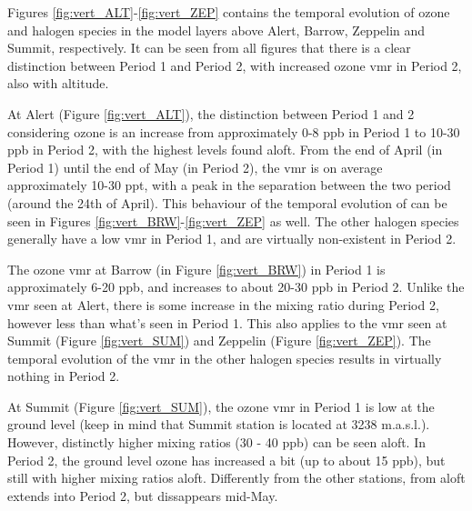 %


\medskip

Figures \ref{fig:vert_ALT}-\ref{fig:vert_ZEP} contains the temporal evolution of ozone and halogen species in the model layers above Alert, Barrow, Zeppelin and Summit, respectively. It can be seen from all figures that there is a clear distinction between Period 1 and Period 2, with increased ozone \acrshort{vmr} in Period 2, also with altitude. 

\medskip

At Alert (Figure \ref{fig:vert_ALT}), the distinction between Period 1 and 2 considering ozone is an increase from approximately 0-8 ppb in Period 1 to 10-30 ppb in Period 2, with the highest levels found aloft. From the end of April (in Period 1) until the end of May (in Period 2), the  \acrshort{vmr} is on average approximately 10-30 ppt, with a peak in the separation between the two period (around the 24th of April). This behaviour of the temporal evolution of  can be seen in Figures \ref{fig:vert_BRW}-\ref{fig:vert_ZEP} as well. The other halogen species generally have a low \acrshort{vmr} in Period 1, and are virtually non-existent in Period 2. 

\medskip

The ozone \acrshort{vmr} at Barrow (in Figure \ref{fig:vert_BRW}) in Period 1 is approximately 6-20 ppb, and increases to about 20-30 ppb in Period 2. Unlike the  \acrshort{vmr} seen at Alert, there is some increase in the mixing ratio during Period 2, however less than what's seen in Period 1. This also applies to the  \acrshort{vmr} seen at Summit (Figure \ref{fig:vert_SUM}) and Zeppelin (Figure \ref{fig:vert_ZEP}). The temporal evolution of the \acrshort{vmr} in the other halogen species results in virtually nothing in Period 2.

\medskip

At Summit (Figure \ref{fig:vert_SUM}), the ozone \acrshort{vmr} in Period 1 is low at the ground level (keep in mind that Summit station is located at 3238 m.a.s.l.). However, distinctly higher mixing ratios (30 - 40 ppb) can be seen aloft. In Period 2, the ground level ozone has increased a bit (up to about 15 ppb), but still with higher mixing ratios aloft. Differently from the other stations,  from aloft extends into Period 2, but dissappears mid-May.

\medskip

